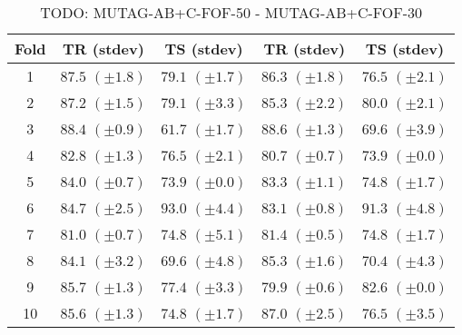 \documentclass[10pt,a4paper]{book}
\begin{document}
\begin{table}[tbph]
\caption{TODO: MUTAG-AB+C-FOF-50 - MUTAG-AB+C-FOF-30}
\label{TODO}
\centering
\begin{tabular}{c*{4}{c}}
\toprule
Fold & TR (stdev) & TS (stdev) & TR (stdev) & TS (stdev)\\
\midrule
1 & $87.5$ $(\pm 1.8)$ & $79.1$ $(\pm 1.7)$ & $86.3$ $(\pm 1.8)$ & $76.5$ $(\pm 2.1)$\\
2 & $87.2$ $(\pm 1.5)$ & $79.1$ $(\pm 3.3)$ & $85.3$ $(\pm 2.2)$ & $80.0$ $(\pm 2.1)$\\
3 & $88.4$ $(\pm 0.9)$ & $61.7$ $(\pm 1.7)$ & $88.6$ $(\pm 1.3)$ & $69.6$ $(\pm 3.9)$\\
4 & $82.8$ $(\pm 1.3)$ & $76.5$ $(\pm 2.1)$ & $80.7$ $(\pm 0.7)$ & $73.9$ $(\pm 0.0)$\\
5 & $84.0$ $(\pm 0.7)$ & $73.9$ $(\pm 0.0)$ & $83.3$ $(\pm 1.1)$ & $74.8$ $(\pm 1.7)$\\
6 & $84.7$ $(\pm 2.5)$ & $93.0$ $(\pm 4.4)$ & $83.1$ $(\pm 0.8)$ & $91.3$ $(\pm 4.8)$\\
7 & $81.0$ $(\pm 0.7)$ & $74.8$ $(\pm 5.1)$ & $81.4$ $(\pm 0.5)$ & $74.8$ $(\pm 1.7)$\\
8 & $84.1$ $(\pm 3.2)$ & $69.6$ $(\pm 4.8)$ & $85.3$ $(\pm 1.6)$ & $70.4$ $(\pm 4.3)$\\
9 & $85.7$ $(\pm 1.3)$ & $77.4$ $(\pm 3.3)$ & $79.9$ $(\pm 0.6)$ & $82.6$ $(\pm 0.0)$\\
10 & $85.6$ $(\pm 1.3)$ & $74.8$ $(\pm 1.7)$ & $87.0$ $(\pm 2.5)$ & $76.5$ $(\pm 3.5)$\\
\bottomrule
\end{tabular}
\end{table}


\end{document}
